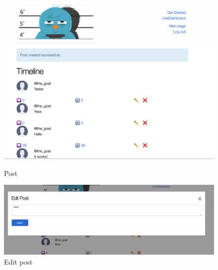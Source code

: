 \begin{figure}[htbp]
	\centering
	
	\begin{minipage}[b]{0.45\textwidth}
		\centering
		\includegraphics[width=\linewidth]{figures/post.png}
		\caption{Post}
		\label{fig:post}
	\end{minipage}
	\hfill
	\begin{minipage}[b]{0.45\textwidth}
		\centering
		\includegraphics[width=\linewidth]{figures/edit.png}
		\caption{Edit post}
		\label{fig:edit}
	\end{minipage}

\end{figure}

